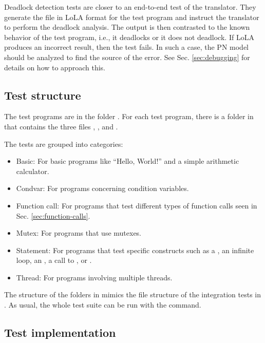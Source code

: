 Deadlock detection tests are closer to an end-to-end test of the translator.
They generate the file in \acrshort{LoLA} format for the test program
and instruct the translator to perform the deadlock analysis.
The output is then contrasted to the known behavior of the test program, i.e.,
it deadlocks or it does not deadlock.
If \acrshort{LoLA} produces an incorrect result, then the test fails.
In such a case, the \acrshort{PN} model should be analyzed
to find the source of the error.
See Sec. \ref{sec:debugging} for details on how to approach this.

\subsection{Test structure}

The test programs are in the folder .
For each test program, there is a folder in 
that contains the three files
, , and .

The tests are grouped into categories:

\begin{itemize}
    \item Basic: For basic programs like ``Hello, World!'' and a simple arithmetic calculator.
    \item Condvar: For programs concerning condition variables.
    \item Function call: For programs that test different types
          of function calls seen in Sec. \ref{sec:function-calls}.
    \item Mutex: For programs that use mutexes.
    \item Statement: For programs that test specific constructs such as a ,
          an infinite loop, an , a call to ,
          or .
    \item Thread: For programs involving multiple threads.
\end{itemize}

The structure of the folders in  mimics the file structure
of the integration tests in .
As usual, the whole test suite can be run with the  command.

\subsection{Test implementation}

